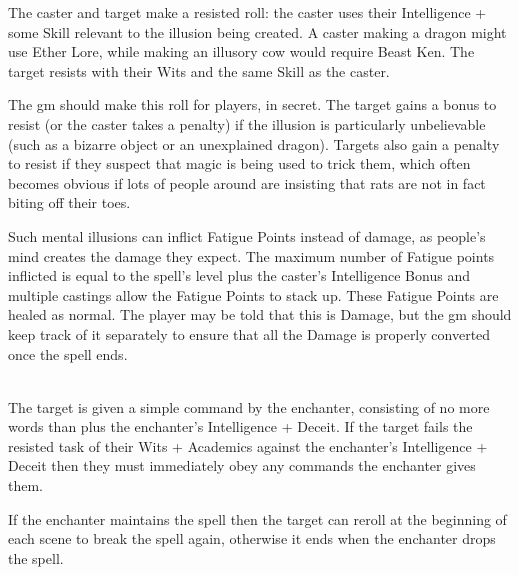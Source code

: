 \begin{multicols}{2}
The caster and target make a resisted roll: the caster uses their Intelligence + some Skill relevant to the illusion being created. A caster making a dragon might use Ether Lore, while making an illusory cow would require Beast Ken. The target resists with their Wits and the same Skill as the caster.

The \gls{gm} should make this roll for players, in secret. The target gains a bonus to resist (or the caster takes a penalty) if the illusion is particularly unbelievable (such as a bizarre object or an unexplained dragon). Targets also gain a penalty to resist if they suspect that magic is being used to trick them, which often becomes obvious if lots of people around are insisting that rats are not in fact biting off their toes.

Such mental illusions can inflict Fatigue Points instead of damage, as people's mind creates the damage they expect.
The maximum number of Fatigue points inflicted is equal to the spell's level plus the caster's Intelligence Bonus and multiple castings allow the Fatigue Points to stack up.
These Fatigue Points are healed as normal.
The player may be told that this is Damage, but the \gls{gm} should keep track of it separately to ensure that all the Damage is properly converted once the spell ends.

\spelllevel

\\
The target is given a simple command by the enchanter, consisting of no more words than  plus the enchanter's Intelligence + Deceit. If the target fails the resisted task of their Wits + Academics against the enchanter's Intelligence + Deceit then they must immediately obey any commands the enchanter gives them.

If the enchanter maintains the spell then the target can reroll at the beginning of each scene to break the spell again, otherwise it ends when the enchanter drops the spell.

\end{multicols}


